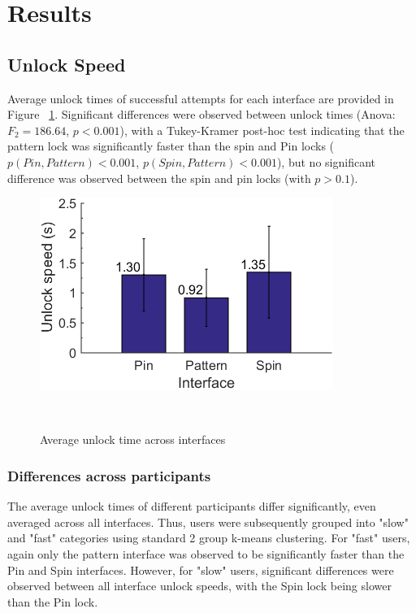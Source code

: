 \documentclass{sigchi}
\begin{document}
\section{Results}

\subsection{Unlock Speed}
Average unlock times of successful attempts for each interface are provided in Figure ~\ref{fig:unlock_speed_bar}. Significant differences were observed between unlock times (Anova: $F_2=186.64$, $p < 0.001$), with a Tukey-Kramer post-hoc test indicating that the pattern lock was significantly faster than the spin and Pin locks ($p(Pin, Pattern) < 0.001 $, $p(Spin,Pattern)< 0.001$), but no significant difference was observed between the spin and pin locks (with $p > 0.1$).

\begin{figure}[h]
  \centering
  \includegraphics[width=0.7\columnwidth]{figures/analysis_1_interface_speed_bar.png}
  \caption{Average unlock time across interfaces}~\label{fig:unlock_speed_bar}
\end{figure}

\subsubsection{Differences across participants}
The average unlock times of different participants differ significantly, even averaged across all interfaces. %
Thus, users were subsequently grouped into "slow" and "fast" categories using standard 2 group k-means clustering. For "fast" users, again only the pattern interface was observed to be significantly faster than the Pin and Spin interfaces. However, for "slow" users, significant differences were observed between all interface unlock speeds, with the Spin lock being slower than the Pin lock.  
\end{document}
